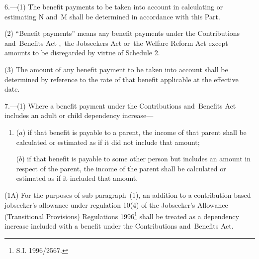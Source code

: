\documentclass[12pt,a4paper]{article}
\begin{document}
\renewcommand\parthead{--- Schedule 1 Part II}

6.—(1) The benefit payments to be taken into account in calculating or estimating N and~M shall be determined in accordance with this Part.

(2) “Benefit payments” means any benefit payments under the Contributions and~Benefits Act%
,~the Jobseekers Act or~the Welfare Reform Act  %
except amounts to be disregarded by virtue of Schedule 2.

(3) The amount of any benefit payment to be taken into account shall be determined by reference to the rate of that benefit applicable at the effective date.


\medskip

7.—(1) Where a benefit payment under the Contributions and~Benefits Act includes an adult or child dependency increase—
\begin{enumerate}\item[]
($a$) if that benefit is payable to a parent, the income of that parent shall be calculated or estimated as if it did not include that amount;

($b$) if that benefit is payable to some other person but includes an amount in respect of the parent, the income of the parent shall be calculated or estimated as if it included that amount.
\end{enumerate}

\begin{sloppypar}
(1A) For the purposes of sub-paragraph~(1), an addition to a contribution\hspace{0pt}-\hspace{0pt}based jobseeker’s allowance under 
regulation 10(4)  %
of the Jobseeker’s Allowance (Transitional Provisions) Regulations 
1996\footnote{\frenchspacing S.I. 1996/2567.}  %
shall be treated as a dependency increase included with a benefit under the Contributions and~Benefits Act.
\end{sloppypar}
\end{document}
